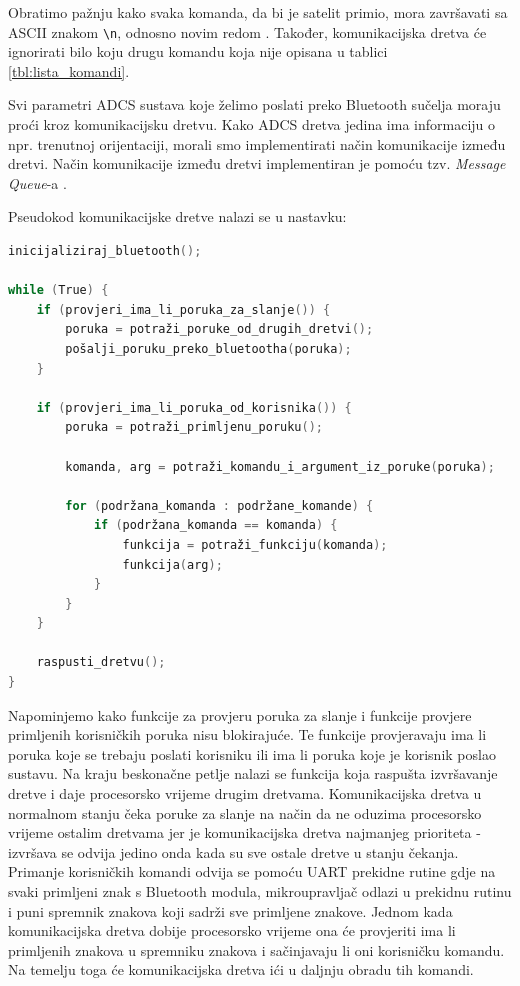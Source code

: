 \documentclass[times, utf8, diplomski, numeric]{templates/template}
\begin{document}
{{{{                Obratimo pažnju kako svaka komanda, da bi je satelit primio, mora završavati sa ASCII znakom \texttt{\textbackslash n}, odnosno novim redom . Također, komunikacijska dretva će ignorirati bilo koju drugu komandu koja nije opisana u tablici \ref{tbl:lista_komandi}.

                Svi parametri ADCS sustava koje želimo poslati preko Bluetooth sučelja moraju proći kroz komunikacijsku dretvu. Kako ADCS dretva jedina ima informaciju o npr. trenutnoj orijentaciji, morali smo implementirati način komunikacije između dretvi. Način komunikacije između dretvi implementiran je pomoću tzv. \emph{Message Queue}-a \cite{message_queue}.

                Pseudokod komunikacijske dretve nalazi se u nastavku:

                \begin{lstlisting}[language=C]
inicijaliziraj_bluetooth();

while (True) {
    if (provjeri_ima_li_poruka_za_slanje()) {
        poruka = potraži_poruke_od_drugih_dretvi();
        pošalji_poruku_preko_bluetootha(poruka);
    }

    if (provjeri_ima_li_poruka_od_korisnika()) {
        poruka = potraži_primljenu_poruku();

        komanda, arg = potraži_komandu_i_argument_iz_poruke(poruka);

        for (podržana_komanda : podržane_komande) {
            if (podržana_komanda == komanda) {
                funkcija = potraži_funkciju(komanda);
                funkcija(arg);
            }
        }
    }

    raspusti_dretvu();
}           \end{lstlisting}

                Napominjemo kako funkcije za provjeru poruka za slanje i funkcije provjere primljenih korisničkih poruka nisu blokirajuće. Te funkcije provjeravaju ima li poruka koje se trebaju poslati korisniku ili ima li poruka koje je korisnik poslao sustavu. Na kraju beskonačne petlje nalazi se funkcija koja raspušta izvršavanje dretve i daje procesorsko vrijeme drugim dretvama. Komunikacijska dretva u normalnom stanju čeka poruke za slanje na način da ne oduzima procesorsko vrijeme ostalim dretvama jer je komunikacijska dretva najmanjeg prioriteta - izvršava se odvija jedino onda kada su sve ostale dretve u stanju čekanja. Primanje korisničkih komandi odvija se pomoću UART prekidne rutine gdje na svaki primljeni znak s Bluetooth modula, mikroupravljač odlazi u prekidnu rutinu i puni spremnik znakova koji sadrži sve primljene znakove. Jednom kada komunikacijska dretva dobije procesorsko vrijeme ona će provjeriti ima li primljenih znakova u spremniku znakova i sačinjavaju li oni korisničku komandu. Na temelju toga će komunikacijska dretva ići u daljnju obradu tih komandi. 
            }
        }
    }

}
\end{document}
